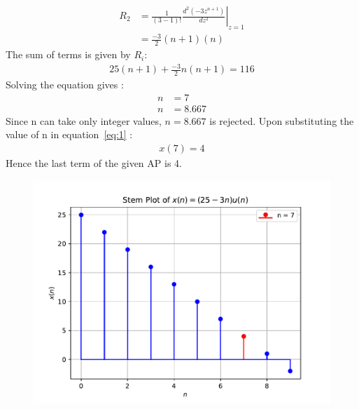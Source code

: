 \documentclass[journal,12pt,twocolumn]{IEEEtran}
\theoremstyle{remark}
\begin{document}
\begin{align}
	R_2 &= \frac{1}{{(3-1)!}} \left. \frac{d^2(-3z^{n+1})}{dz^2} \right|_{z=1} \\
	&= \frac{-3}{2}(n+1)(n)
\end{align}
The sum of terms is given by $R_i$:
 \begin{align}
25(n+1)	+ \frac{-3}{2} n(n+1) = 116 
 \end{align}
Solving the equation gives :
\begin{align}
	n&=7\\ n&=8.667
\end{align}
Since n can take only integer values, $n=8.667$ is rejected. 
Upon substituting the value of n in equation~\eqref{eq:1} :
\begin{align}
	x(7)=4
\end{align}
Hence the last term of the given AP is 4.
\begin{figure}[h!]
	\centering
	\includegraphics[width=\columnwidth]{figs/stem_plot.pdf}
	\label{fig:plot}
\end{figure}
\end{document}
